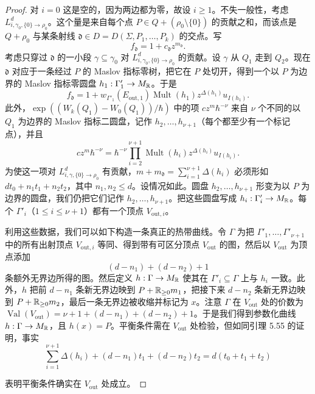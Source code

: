 \begin{proof}
对 $i=0$ 这是空的，因为两边都为零，故设 $i\ge1$。不失一般性，考虑 $L^d_{i,\gamma_0,\{0\}\to\rho_0}$。这个量是来自每个点 $P\in Q+(\rho_0\setminus\{0\})$ 的贡献之和，而该点是 $Q+\rho_0$ 与某条射线 $\mathfrak d\in D=D(\Sigma,P_1,\ldots,P_k)$ 的交点。写
\[
  f_{\mathfrak d}=1+c_{\mathfrak d}z^{m_{\mathfrak d}}.
\]
考虑只穿过 $\mathfrak d$ 的一小段 $\gamma\subseteq\gamma_0$ 对 $L^d_{i,\gamma_0,\{0\}\to\rho_0}$ 的贡献。设 $\gamma$ 从 $Q_1$ 走到 $Q_2$。现在 $\mathfrak d$ 对应于一条经过 $P$ 的 Maslov 指标零树，把它在 $P$ 处切开，得到一个以 $P$ 为边界的 Maslov 指标零圆盘 $h_1:\Gamma'_1\to M_{\mathbb{R}}$。于是
\[
  f_{\mathfrak d}=1+w_{\Gamma'_1}(E_{\mathrm{out},1})\operatorname{Mult}(h_1)z^{\Delta(h_1)}u_{I(h_1)}.
\]
此外，$\exp((W_k(Q_1)-W_0(Q_1))/\hbar)$ 中的项 $cz^m\hbar^{-\nu}$ 来自 $\nu$ 个不同的以 $Q_1$ 为边界的 Maslov 指标二圆盘，记作 $h_2,\ldots,h_{\nu+1}$（每个都至少有一个标记点），并且
\[
  cz^m\hbar^{-\nu}=\hbar^{-\nu}\prod_{i=2}^{\nu+1}\operatorname{Mult}(h_i)z^{\Delta(h_i)}u_{I(h_i)}.
\]
为使这一项对 $L^d_{i,\gamma,\{0\}\to\rho_0}$ 有贡献，$m+m_{\mathfrak d}=\sum_{i=1}^{\nu+1}\Delta(h_i)$ 必须形如 $dt_0+n_1t_1+n_2t_2$，其中 $n_1,n_2\le d$。设情况如此。圆盘 $h_2,\ldots,h_{\nu+1}$ 形变为以 $P$ 为边界的圆盘，我们仍把它们记作 $h_2,\ldots,h_{\nu+1}$。把这些圆盘写成 $h_i:\Gamma'_i\to M_{\mathbb{R}}$。每个 $\Gamma'_i$（$1\le i\le\nu+1$）都有一个顶点 $V_{\mathrm{out},i}$。

利用这些数据，我们可以如下构造一条真正的热带曲线。令 $\Gamma$ 为把 $\Gamma'_1,\ldots,\Gamma'_{\nu+1}$ 中的所有出射顶点 $V_{\mathrm{out},i}$ 等同、得到带有可区分顶点 $V_{\mathrm{out}}$ 的图，然后以 $V_{\mathrm{out}}$ 为顶点添加
\[
  (d-n_1)+(d-n_2)+1
\]
条额外无界边所得的图。然后定义 $h:\Gamma\to M_{\mathbb{R}}$ 使其在 $\Gamma'_i\subseteq\Gamma$ 上与 $h_i$ 一致。此外，$h$ 把前 $d-n_1$ 条新无界边映到 $P+\mathbb{R}_{\ge0}m_1$，把接下来 $d-n_2$ 条新无界边映到 $P+\mathbb{R}_{\ge0}m_2$，最后一条无界边被收缩并标记为 $x$。注意 $\Gamma$ 在 $V_{\mathrm{out}}$ 处的价数为 $\operatorname{Val}(V_{\mathrm{out}})=\nu+1+(d-n_1)+(d-n_2)+1$。于是我们得到参数化曲线 $h:\Gamma\to M_{\mathbb{R}}$，且 $h(x)=P$。平衡条件需在 $V_{\mathrm{out}}$ 处检验，但如同引理 5.55 的证明，事实
\[
  \sum_{i=1}^{\nu+1}\Delta(h_i)+(d-n_1)t_1+(d-n_2)t_2=d(t_0+t_1+t_2)
\]

表明平衡条件确实在 $V_{\mathrm{out}}$ 处成立。


\end{proof}
